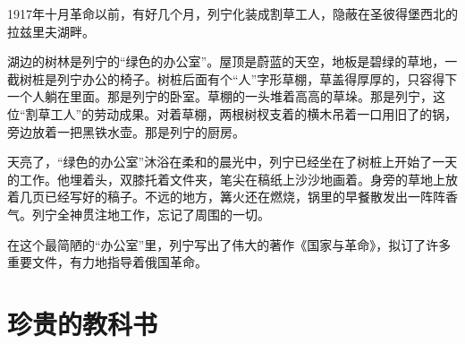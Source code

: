 \documentclass[12pt,UTF-8,openany]{ctexbook}
\begin{document}
\begin{large}
    
    1917年十月革命以前，有好几个月，列宁化装成割草工人，隐蔽在圣彼得堡西北的拉兹里夫湖畔。
    
    湖边的树林是列宁的“绿色的办公室”。屋顶是蔚蓝的天空，地板是碧绿的草地，一截树桩是列宁办公的椅子。树桩后面有个“人”字形草棚，草盖得厚厚的，只容得下一个人躺在里面。那是列宁的卧室。草棚的一头堆着高高的草垛。那是列宁，这位“割草工人”的劳动成果。对着草棚，两根树杈支着的横木吊着一口用旧了的锅，旁边放着一把黑铁水壶。那是列宁的厨房。
    
    天亮了，“绿色的办公室”沐浴在柔和的晨光中，列宁已经坐在了树桩上开始了一天的工作。他埋着头，双膝托着文件夹，笔尖在稿纸上沙沙地画着。身旁的草地上放着几页已经写好的稿子。不远的地方，篝火还在燃烧，锅里的早餐散发出一阵阵香气。列宁全神贯注地工作，忘记了周围的一切。
    
    在这个最简陋的“办公室”里，列宁写出了伟大的著作《国家与革命》，拟订了许多重要文件，有力地指导着俄国革命。
    
\end{large}



\chapter{珍贵的教科书}
\end{document}

